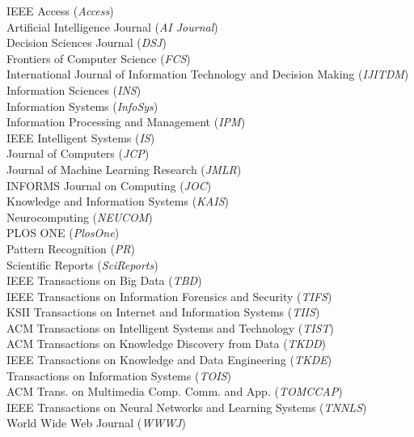 \documentclass[10pt]{article}
\newenvironment{myindentpar}[1]%
{\begin{list}{}%
         {\setlength{\leftmargin}{#1}}%
         \item[]%
}
{\end{list}}
\newcounter{list}
\begin{document}
\begin{myindentpar}{0.75cm}
{}

\hspace{-0.75cm}{\bf Journal Reviewer}

{\small

IEEE Access (\textit{Access}) \\
Artificial Intelligence Journal (\textit{AI Journal}) \\
Decision Sciences Journal (\textit{DSJ}) \\
Frontiers of Computer Science (\textit{FCS}) \\
International Journal of Information Technology and Decision Making (\textit{IJITDM}) \\
Information Sciences (\textit{INS}) \\
Information Systems (\textit{InfoSys}) \\
Information Processing and Management (\textit{IPM}) \\
IEEE Intelligent Systems (\textit{IS}) \\
Journal of Computers (\textit{JCP}) \\
Journal of Machine Learning Research (\textit{JMLR}) \\
INFORMS Journal on Computing (\textit{JOC}) \\
Knowledge and Information Systems (\textit{KAIS}) \\
Neurocomputing (\textit{NEUCOM}) \\
PLOS ONE (\textit{PlosOne}) \\
Pattern Recognition (\textit{PR}) \\
Scientific Reports (\textit{SciReports}) \\
IEEE Transactions on Big Data (\textit{TBD}) \\
IEEE Transactions on Information Forensics and Security (\textit{TIFS}) \\
KSII Transactions on Internet and Information Systems (\textit{TIIS}) \\
ACM Transactions on Intelligent Systems and Technology (\textit{TIST}) \\
ACM Transactions on Knowledge Discovery from Data (\textit{TKDD}) \\
IEEE Transactions on Knowledge and Data Engineering (\textit{TKDE}) \\
Transactions on Information Systems (\textit{TOIS}) \\
ACM Trans. on Multimedia Comp. Comm. and App. (\textit{TOMCCAP}) \\
IEEE Transactions on Neural Networks and Learning Systems (\textit{TNNLS}) \\
World Wide Web Journal (\textit{WWWJ})

}

\end{myindentpar}
\end{document}
